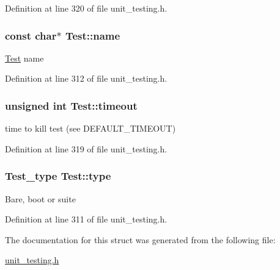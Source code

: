 Definition at line 320 of file unit\+\_\+testing.\+h.

\subsubsection[{\texorpdfstring{name}{name}}]{\setlength{\rightskip}{0pt plus 5cm}const char$\ast$ Test\+::name}\hypertarget{structTest_ae44674e48b203d9c26e04e09b6fe5b61}{}\label{structTest_ae44674e48b203d9c26e04e09b6fe5b61}
\hyperlink{structTest}{Test} name 

Definition at line 312 of file unit\+\_\+testing.\+h.

\subsubsection[{\texorpdfstring{timeout}{timeout}}]{\setlength{\rightskip}{0pt plus 5cm}unsigned int Test\+::timeout}\hypertarget{structTest_a80e78f2e6aeed2a6e5b7c705ce5a1493}{}\label{structTest_a80e78f2e6aeed2a6e5b7c705ce5a1493}
time to kill test (see D\+E\+F\+A\+U\+L\+T\+\_\+\+T\+I\+M\+E\+O\+UT) 

Definition at line 319 of file unit\+\_\+testing.\+h.

\subsubsection[{\texorpdfstring{type}{type}}]{\setlength{\rightskip}{0pt plus 5cm}Test\+\_\+type Test\+::type}\hypertarget{structTest_a5074007b777ea0958966027197c17792}{}\label{structTest_a5074007b777ea0958966027197c17792}
Bare, boot or suite 

Definition at line 311 of file unit\+\_\+testing.\+h.



The documentation for this struct was generated from the following file\+:\begin{DoxyCompactItemize}
\item 
\hyperlink{unit__testing_8h}{unit\+\_\+testing.\+h}\end{DoxyCompactItemize}

